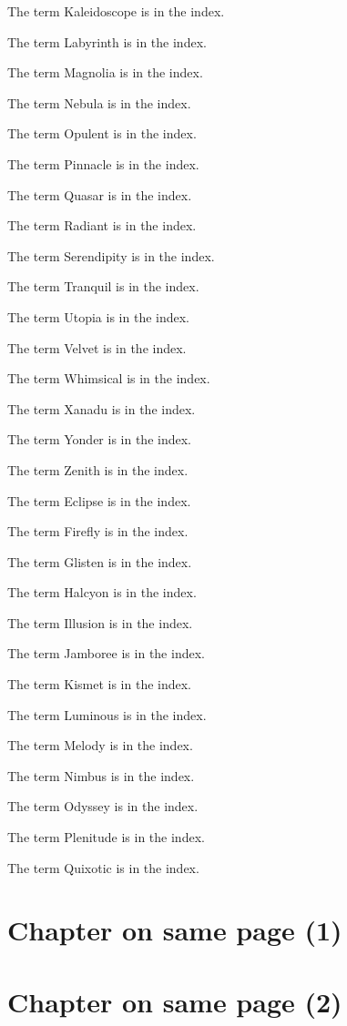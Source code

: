 The term Kaleidoscope  is in the index.

The term Labyrinth  is in the index.

The term Magnolia  is in the index.

The term Nebula  is in the index.

The term Opulent  is in the index.

The term Pinnacle  is in the index.

The term Quasar  is in the index.

The term Radiant  is in the index.

The term Serendipity  is in the index.

The term Tranquil  is in the index.

The term Utopia  is in the index.

The term Velvet  is in the index.

The term Whimsical  is in the index.

The term Xanadu  is in the index.

The term Yonder  is in the index.

The term Zenith  is in the index.

The term Eclipse  is in the index.

The term Firefly  is in the index.

The term Glisten  is in the index.

The term Halcyon  is in the index.

The term Illusion  is in the index.

The term Jamboree  is in the index.

The term Kismet  is in the index.

The term Luminous  is in the index.

The term Melody  is in the index.

The term Nimbus  is in the index.

The term Odyssey  is in the index.

The term Plenitude  is in the index.

The term Quixotic  is in the index.



\chapter{Chapter on same page (1)}

{\let\clearpage\relax\chapter{Chapter on same page (2)}}

\stopcontents